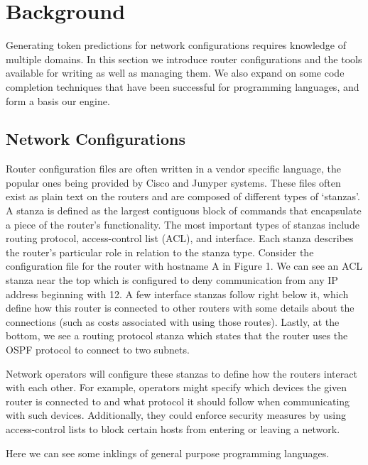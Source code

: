\section{Background}

Generating token predictions for network configurations requires knowledge of multiple domains. In this section we introduce router configurations and the tools available for writing as well as managing them. We also expand on some code completion techniques that have been successful for programming languages, and form a basis our engine.

\subsection{Network Configurations} 

Router configuration files are often written in a vendor specific language, the popular ones being provided by Cisco and Junyper systems. These files often exist as plain text on the routers and are composed of different types of `stanzas'. A stanza is defined as the largest contiguous block of commands that encapsulate a piece of the router's functionality. The most important types of stanzas include routing protocol, access-control list (ACL), and interface. Each stanza describes the router's particular role in relation to the stanza type. Consider the configuration file for the router with hostname A in Figure 1. We can see an ACL stanza near the top which is configured to deny communication from any IP address beginning with 12. A few interface stanzas follow right below it, which define how this router is connected to other routers with some details about the connections (such as costs associated with using those routes). Lastly, at the bottom, we see a routing protocol stanza which states that the router uses the OSPF protocol to connect to two subnets.  

Network operators will configure these stanzas to define how the routers interact with each other. For example, operators might specify which devices the given router is connected to and what protocol it should follow when communicating with such devices. Additionally, they could enforce security measures by using access-control lists to block certain hosts from entering or leaving a network. 

Here we can see some inklings of general purpose programming languages. 

